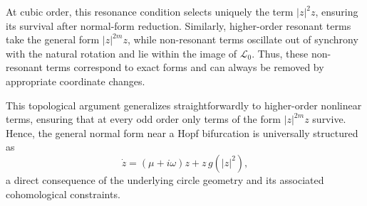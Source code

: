 At cubic order, this resonance condition selects uniquely the term $|z|^2 z$, ensuring its survival after normal-form reduction. Similarly, higher-order resonant terms take the general form $|z|^{2m} z$, while non-resonant terms oscillate out of synchrony with the natural rotation and lie within the image of $\mathcal{L}_0$. Thus, these non-resonant terms correspond to exact forms and can always be removed by appropriate coordinate changes.

This topological argument generalizes straightforwardly to higher-order nonlinear terms, ensuring that at every odd order only terms of the form $|z|^{2m} z$ survive. Hence, the general normal form near a Hopf bifurcation is universally structured as
\[
\dot z = (\mu+i\omega)z + z\,g(|z|^2),
\]
a direct consequence of the underlying circle geometry and its associated cohomological constraints.






    

